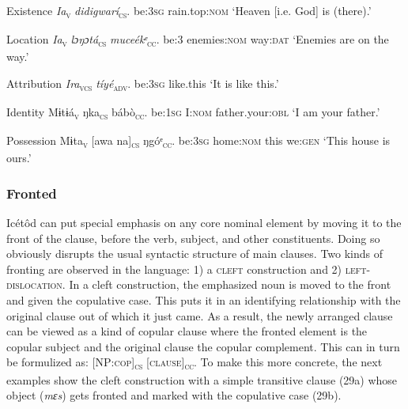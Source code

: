 Existence
\textit{Ia}\textsc{\textsubscript{v}}\textit{     didigwarí}\textsc{\textsubscript{cs}}.
be:\textsc{3sg}   rain.top:\textsc{nom}
‘Heaven [i.e. God] is (there).’




Location
\textit{Ia}\textsc{\textsubscript{v}}\textit{   lɔŋɔtá}\textsc{\textsubscript{cs}}\textit{     muceékᵉ}\textsc{\textsubscript{cc}}.
be:3   enemies:\textsc{nom}   way:\textsc{dat}
‘Enemies are on the way.’




Attribution
\textit{Ira}\textsc{\textsubscript{vcs}}\textit{     tíyé}\textsc{\textsubscript{adv}}.
be:\textsc{3sg}   like.this
‘It is like this.’




Identity
Mɨtɨá\textsc{\textsubscript{v}}   ŋka\textsc{\textsubscript{cs}}    bábò\textsc{\textsubscript{cc}}.
be:\textsc{1sg}   I:\textsc{nom}    father.your:\textsc{obl}
‘I am your father.’




Possession
Mɨta\textsc{\textsubscript{v}}     [awa     na]\textsc{\textsubscript{cs}}   ŋgóᵉ\textsc{\textsubscript{cc}}.
be:\textsc{3sg}   home:\textsc{nom}   this   we:\textsc{gen}
‘This house is ours.’




\subsubsection{Fronted}

Icétôd can put special emphasis on any core nominal element by moving it to the front of the clause, before the verb, subject, and other constituents. Doing so obviously disrupts the usual syntactic structure of main clauses. Two kinds of fronting are observed in the language: 1) a \textsc{cleft} construction and 2) \textsc{left-dislocation}. In a cleft construction, the emphasized noun is moved to the front and given the copulative case. This puts it in an identifying relationship with the original clause out of which it just came. As a result, the newly arranged clause can be viewed as a kind of copular clause where the fronted element is the copular subject and the original clause the copular complement. This can in turn be formulized as: [NP:\textsc{cop}]\textsc{\textsubscript{cs}}\textsc{ [clause]}\textsc{\textsubscript{cc}}. To make this more concrete, the next examples show the cleft construction with a simple transitive clause (29a) whose object (\textit{mɛs}) gets fronted and marked with the copulative case (29b). 




